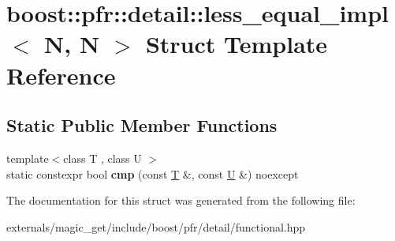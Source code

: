 \hypertarget{structboost_1_1pfr_1_1detail_1_1less__equal__impl_3_01_n_00_01_n_01_4}{}\section{boost\+:\+:pfr\+:\+:detail\+:\+:less\+\_\+equal\+\_\+impl$<$ N, N $>$ Struct Template Reference}
\label{structboost_1_1pfr_1_1detail_1_1less__equal__impl_3_01_n_00_01_n_01_4}
\subsection*{Static Public Member Functions}
\begin{DoxyCompactItemize}
\item 
\mbox{\label{structboost_1_1pfr_1_1detail_1_1less__equal__impl_3_01_n_00_01_n_01_4_a1d4ec3f669d928d7b690977d97cb456a}} 
{\footnotesize template$<$class T , class U $>$ }\\static constexpr bool {\bfseries cmp} (const \mbox{\hyperlink{struct_t}{T}} \&, const \mbox{\hyperlink{union_u}{U}} \&) noexcept
\end{DoxyCompactItemize}


The documentation for this struct was generated from the following file\+:\begin{DoxyCompactItemize}
\item 
externals/magic\+\_\+get/include/boost/pfr/detail/functional.\+hpp\end{DoxyCompactItemize}
